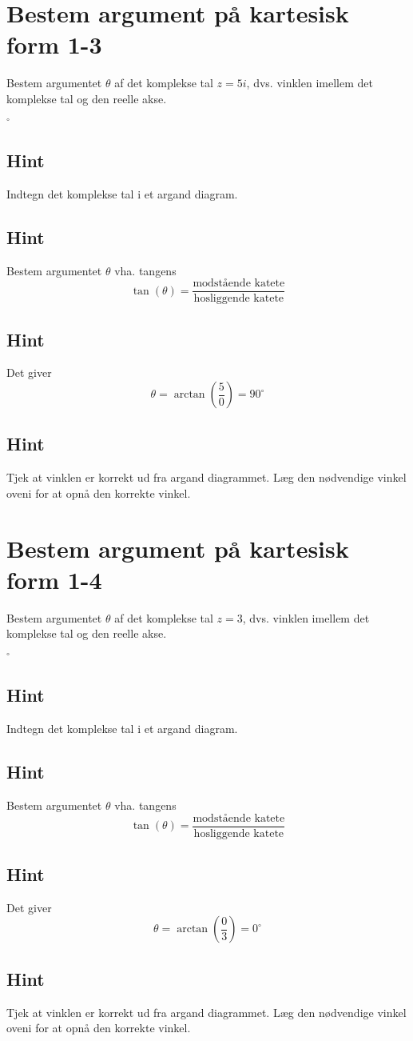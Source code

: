 \documentclass{article}
\newenvironment{exercise}[1]{\newpage\section{#1}}{}
\newcommand{\answerbox}[1]{\fbox{$#1$}}
\newcommand{\hint}{\subsection*{Hint}}
\begin{document}
\begin{exercise}{Bestem argument på kartesisk form 1-3}
	
	Bestem argumentet $\theta$ af det komplekse tal $z=5i$, dvs. vinklen imellem det komplekse tal og den reelle akse.
	
	\answerbox{90}$^\circ$
	
	
	\hint 
	
	Indtegn det komplekse tal i et argand diagram.
	
	
	\hint
	
	Bestem argumentet $\theta$ vha. tangens
	\[
	\tan(\theta)=\frac{\textrm{modstående katete}}{\textrm{hosliggende katete}}
	\]
	
	\hint 
	
	Det giver
	\[
	\theta = \arctan \left(\frac{5}{0}\right) = 90^\circ
	\]
	
	\hint
	
	Tjek at vinklen er korrekt ud fra argand diagrammet. Læg den nødvendige vinkel oveni for at opnå den korrekte vinkel. 
	
	
\end{exercise}

\newpage

\begin{exercise}{Bestem argument på kartesisk form 1-4}
	
	Bestem argumentet $\theta$ af det komplekse tal $z=3$, dvs. vinklen imellem det komplekse tal og den reelle akse.
	
	\answerbox{0}$^\circ$
	
	
	\hint 
	
	Indtegn det komplekse tal i et argand diagram.
	
	
	\hint
	
	Bestem argumentet $\theta$ vha. tangens
	\[
	\tan(\theta)=\frac{\textrm{modstående katete}}{\textrm{hosliggende katete}}
	\]
	
	\hint 
	
	Det giver
	\[
	\theta = \arctan \left(\frac{0}{3}\right) = 0^\circ
	\]
	
	\hint
	
	Tjek at vinklen er korrekt ud fra argand diagrammet. Læg den nødvendige vinkel oveni for at opnå den korrekte vinkel. 
	
	
\end{exercise}

\newpage
\end{document}
